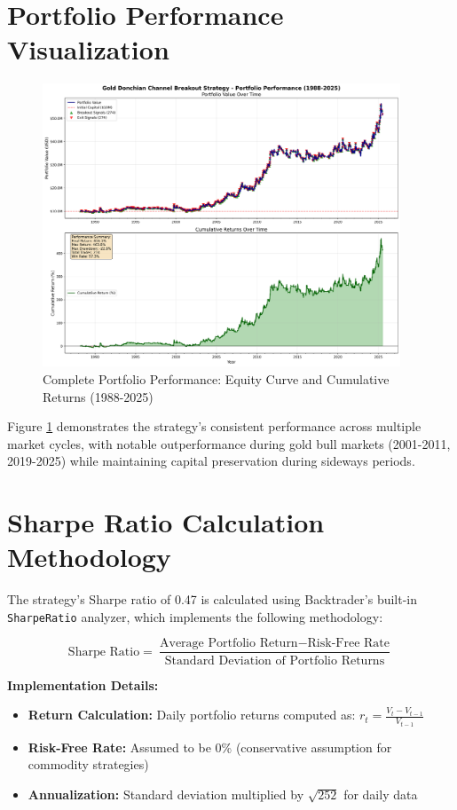 \documentclass[11pt,a4paper]{article}
\begin{document}
\section{Portfolio Performance Visualization}

\begin{figure}[H]
\centering
\includegraphics[width=0.95\textwidth]{gold_donchian_breakout_performance.png}
\caption{Complete Portfolio Performance: Equity Curve and Cumulative Returns (1988-2025)}
\label{fig:portfolio_performance}
\end{figure}

\noindent Figure \ref{fig:portfolio_performance} demonstrates the strategy's consistent performance across multiple market cycles, with notable outperformance during gold bull markets (2001-2011, 2019-2025) while maintaining capital preservation during sideways periods.

\section{Sharpe Ratio Calculation Methodology}

\noindent The strategy's Sharpe ratio of 0.47 is calculated using Backtrader's built-in \texttt{SharpeRatio} analyzer, which implements the following methodology:

\begin{equation}
\text{Sharpe Ratio} = \frac{\text{Average Portfolio Return} - \text{Risk-Free Rate}}{\text{Standard Deviation of Portfolio Returns}}
\end{equation}

\noindent \textbf{Implementation Details:}
\begin{itemize}
\item \textbf{Return Calculation:} Daily portfolio returns computed as: $r_t = \frac{V_t - V_{t-1}}{V_{t-1}}$
\item \textbf{Risk-Free Rate:} Assumed to be 0\% (conservative assumption for commodity strategies)
\item \textbf{Annualization:} Standard deviation multiplied by $\sqrt{252}$ for daily data
\end{itemize}
\end{document}
